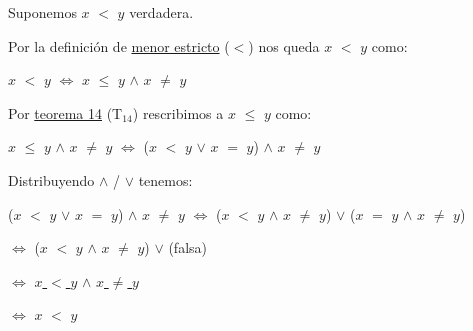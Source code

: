 \documentclass[12pt]{article}
\begin{document}
{} \vspace{0.5cm} 

Suponemos {\Large{$x$ $<$ $y$}} {\textcolor{pakistangreen}{verdadera.}} \vspace{0.5cm}

{\textcolor{carrotorange}{Por la definición de {\underline{menor estricto}}}} {(\Large{\textcolor{pakistangreen}{$<$}})} nos queda {{\Large{$x$ $<$ $y$}} como:\vspace{0.5cm}}

\hspace{4cm} $x$ $<$ $y$ $\Longleftrightarrow$ $x$ $\leq$ $y$ $\wedge$ $x$ $\neq$ $y$ \vspace{0.5cm}

{\textcolor{carrotorange}{Por {\underline{teorema 14}} (T$_{14}$)}} rescribimos a {\Large{$x$ $\leq$ $y$}} como: \vspace{0.5cm}

\hspace{2.1cm} $x$ $\leq$ $y$ $\wedge$ $x$ $\neq$ $y$ $\Longleftrightarrow$ ($x$ $<$ $y$ $\vee$ $x$ $=$ $y$) $\wedge$ $x$ $\neq$ $y$\vspace{0.5cm}

{\textcolor{carrotorange}{Distribuyendo $\wedge$ / $\vee$}} tenemos: \vspace{0.5cm}

($x$ $<$ $y$  $\vee$ $x$ $=$ $y$) $\wedge$ $x$ $\neq$ $y$ $\Longleftrightarrow$ ($x$ $<$ $y$ $\wedge$ $x$ $\neq$ $y$) $\vee$ ($x$ $=$ $y$ $\wedge$ $x$ $\neq$ $y$) \vspace{0.5cm}

 \hspace{5.4cm} $\Longleftrightarrow$ ($x$ $<$ $y$ $\wedge$ $x$ $\neq$ $y$) $\vee$ (falsa) \vspace{0.5cm}
 
\hspace{5.6cm}$\Longleftrightarrow$ {{\underline{$x$ $<$ $y$}} $\wedge$ {{\underline{$x$ $\neq$ $y$}}}} \vspace{0.01cm}

\hspace{7cm} {} \hspace{1.3cm} {} \vspace{0.2cm}

\hspace{5.45cm} $\Longleftrightarrow$ $x$ $<$ $y$ \hspace{0.2cm} \fbox{\textcolor{bluegray}{no resuelto, faltó llegar a:} {\textcolor{pakistangreen}{$x+z$ $<$ $y+z$}}} \vspace{0.5cm} 
\end{document}
